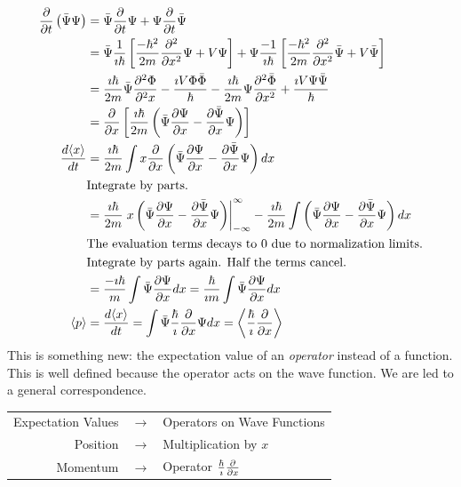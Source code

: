 \documentclass[fleqn,letterpaper]{report}
\begin{document}
\begin{align*}
\frac{\partial}{\partial t} \left( \bar{\Psi}\Psi \right) & = \bar{\Psi}
\frac{\partial}{\partial t} \Psi + \Psi \frac{\partial}{\partial t} \bar{\Psi} \\
& = \bar{\Psi} \frac{1}{\imath \hbar} \left[
\frac{-\hbar^2}{2m} \frac{\partial^2}{\partial x^2} \Psi + V \Psi
\right] + \Psi \frac{-1}{\imath \hbar} \left[
\frac{-\hbar^2}{2m} \frac{\partial^2}{\partial x^2} \bar{\Psi} + V
\bar{\Psi} \right] \\
& = \frac{\imath \hbar}{2m} \bar{\Psi} \frac{\partial^2 \Phi}{\partial^2
x} - \frac{\imath V \Phi \bar{\Phi}}{\hbar} - \frac{\imath
\hbar}{2m} \Psi \frac{\partial^2 \bar{\Phi}}{\partial x^2} +
\frac{\imath V \Psi \bar{\Psi}}{\hbar} \\
& = \frac{\partial}{\partial x} \left[ \frac{\imath \hbar}{2m} \left(
\bar{\Psi} \frac{\partial \Psi}{\partial x} - \frac{\partial
\bar{\Psi}}{\partial x} \Psi \right) \right] \\
\frac{d\langle x\rangle}{dt} & = \frac{\imath \hbar}{2m} \int x 
\frac{\partial}{\partial x} \left( \bar{\Psi} \frac{\partial \Psi}{\partial x}
- \frac{\partial \bar{\Psi}}{\partial x} \Psi \right) dx \\
& \text{Integrate by parts.} \\
& = \frac{\imath \hbar}{2m} \left. x \left( \bar{\Psi}
\frac{\partial \Psi}{\partial x} - \frac{\partial \bar{\Psi}}{\partial x} \Psi
\right) \right|_{-\infty}^{\infty} - \frac{\imath \hbar}{2m}
\int \left( \bar{\Psi} \frac{\partial \Psi}{\partial x} - \frac{\partial
\bar{\Psi}}{\partial x} \Psi \right) dx \\
& \text{The evaluation terms decays to 0 due to normalization
limits.} \\
& \text{Integrate by parts again. Half the terms cancel.} \\
& = \frac{-\imath \hbar}{m} \int \bar{\Psi} \frac{\partial
\Psi}{\partial x} dx = \frac{\hbar}{\imath m} \int \bar{\Psi} \frac{\partial
\Psi}{\partial x} dx \\
\langle p\rangle & = \frac{d \langle x \rangle}{dt} = \int \bar{\Psi}
\frac{\hbar}{\imath}
\frac{\partial}{\partial x} \Psi dx = \left\langle \frac{\hbar}{\imath}
\frac{\partial}{\partial x} \right\rangle
\end{align*}
This is something new: the expectation value of an
\emph{operator} instead of a function. This is well defined
because the operator acts on the wave function. We are led to
a general correspondence.

\begin{tabular}{rcl}
Expectation Values & $\rightarrow$ & Operators on Wave
Functions \\
Position & $\rightarrow$ & Multiplication by $x$ \\
Momentum & $\rightarrow$ & Operator $\frac{\hbar}{\imath}
\frac{\partial}{\partial x}$
\end{tabular}
\end{document}
